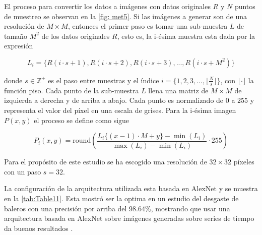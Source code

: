 El proceso para convertir los datos a imágenes con datos originales $R$ y $N$ puntos de muestreo se observan en la \autoref{fig: met5}.  Si las imágenes a generar son de una resolución de $M \times M$, entonces el primer paso es tomar una sub-muestra $L$ de tamaño $M^2$ de los datos originales $R$, esto es, la i-ésima muestra esta dada por la expresión 

\[ L_i = \{R(i\cdot s+1),R(i\cdot s+2),R(i\cdot s+3),...,R(i\cdot s+M^2)\} \]

donde $s\in \mathbb{Z}^+$ es el paso entre muestras y el índice $i = \{1,2,3,...,  \lfloor\frac{N}{s}\rfloor\}$, con $\lfloor \cdot \rfloor$ la función piso. Cada punto de la sub-muestra $L$ llena una matriz de $M\times M$ de izquierda a derecha y de arriba a abajo. Cada punto es normalizado de $0$ a $255$ y representa el valor del píxel en una escala de grises. Para la i-ésima imagen $P(x,y)$ el proceso se define como sigue

\[ P_i(x,y) =  \textrm{round}\left(\frac{L_i\{(x-1)\cdot M+y\}-\min(L_i)}{\max(L_i)-\min(L_i)}\cdot 255\right)\]

Para el propósito de este estudio se ha escogido una resolución de $32\times 32$ píxeles con un paso $s = 32$.    

La configuración de la arquitectura utilizada esta basada en AlexNet y se muestra en la \autoref{tab:Table11}. Esta mostró ser la optima en un estudio del desgaste de baleros con una precisión por arriba del $98.64\%$, mostrando que usar una arquitectura basada en AlexNet sobre imágenes generadas sobre series de tiempo da buenos resultados \cite{pinedo-sanchezVibrationAnalysisBearings2020}. 

